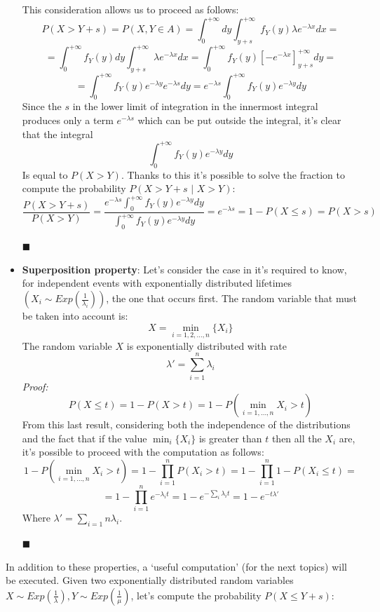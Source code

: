 \documentclass[12pt,a4paper]{article}
\begin{document}
\begin{itemize}
\begin{figure}[H]
\begin{center}
\end{center}
\end{figure}
This consideration allows us to proceed as follows:
$$
P(X>Y+s) = P(X,Y\in A) = \int_{0}^{+\infty}dy\int_{y+s}^{+\infty}f_Y(y)\lambda e^{-\lambda x}dx=
$$
$$
=\int_{0}^{+\infty}f_Y(y)dy\int_{y+s}^{+\infty}\lambda e^{-\lambda x}dx=\int_{0}^{+\infty}f_Y(y)
\left[-e^{-\lambda x}\right]^{+\infty}_{y+s}dy =
$$
$$
=\int_{0}^{+\infty}f_Y(y)e^{-\lambda y}e^{-\lambda s}dy = e^{-\lambda s}
\int_{0}^{+\infty}f_Y(y)e^{-\lambda y}dy 
$$
Since the $s$ in the lower limit of integration in the innermost integral produces only a term 
$e^{-\lambda s}$ which can be put outside the integral, it's clear that the integral
$$
\int_{0}^{+\infty}f_Y(y)e^{-\lambda y}dy
$$
Is equal to $P(X>Y)$. Thanks to this it's possible to solve the fraction to compute the probability 
$P(X>Y+s\hspace{4pt}|\hspace{4pt}X>Y)$:
$$
\frac{P(X>Y+s)}{P(X>Y)} = \frac{e^{-\lambda s}\int_{0}^{+\infty}f_Y(y)e^{-\lambda y}dy }
{\int_{0}^{+\infty}f_Y(y)e^{-\lambda y}dy } = e^{-\lambda s} = 1-P(X\leq s) = P(X>s)
$$
\begin{flushright}
$\blacksquare$
\end{flushright}
\newpage
\item \textbf{Superposition property}:
Let's consider the case in it's required to know, for independent events with exponentially distributed lifetimes $\left( X_i\sim Exp\left(\frac{1}{\lambda_i}\right)\right)$, the one that occurs first. The random variable that must be taken into account is:
$$
X=\min_{i=1,2,\dots,n}{\{X_i\}}
$$ 
The random variable $X$ is exponentially distributed with rate 
$$
\lambda '=\sum_{i=1}^{n}\lambda_i
$$
\emph{Proof:}
$$
P(X\leq t) = 1-P(X>t) = 1-P(\min_{i=1,\dots,n}{X_i}>t)
$$
From this last result, considering both the independence of the distributions and the fact that if the value $\min_i{\{X_i\}}$ is greater than $t$ then all the $X_i$ are, it's possible to proceed with the computation as follows:
$$
1-P(\min_{i=1,\dots,n}{X_i}>t) = 1-\prod_{i=1}^{n}{P(X_i>t)} = 1-\prod_{i=1}^{n}{1-P(X_i\leq t)} =
$$
$$
= 1-\prod_{i=1}^{n}{e^{-\lambda_{i}t}} = 1-e^{-\sum_{i}{\lambda_i t}} = 1-e^{-t\lambda'}
$$
Where $\lambda' = \sum_{i=1}{n}{\lambda_i}$.
\begin{flushright}
$\blacksquare$
\end{flushright}
\end{itemize}
In addition to these properties, a `useful computation' (for the next topics) will be executed. Given two exponentially distributed random variables $X\sim Exp\left(\frac{1}{\lambda}\right),Y\sim Exp\left(\frac{1}{\mu}\right)$, let's compute the probability $P(X \leq Y+s)$:
\end{document}
